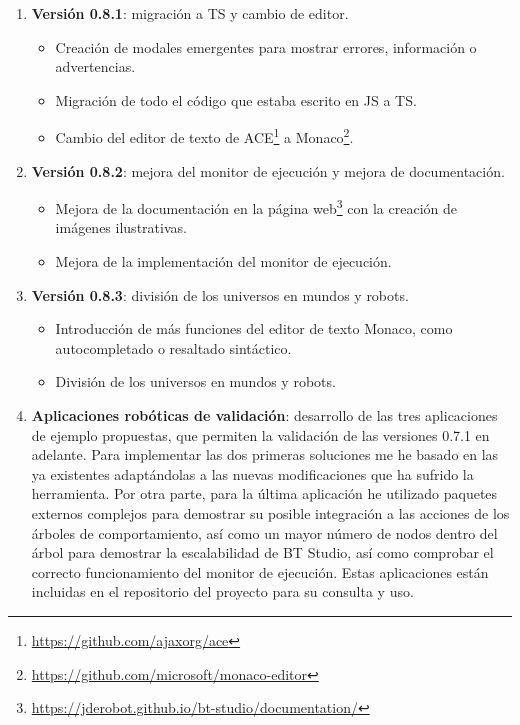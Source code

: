 \begin{enumerate}
    \item \textbf{Versión 0.8.1}: migración a TS y cambio de editor.
    \begin{itemize}
        \item Creación de modales emergentes para mostrar errores, información o advertencias.
        \item Migración de todo el código que estaba escrito en JS a TS.
        \item Cambio del editor de texto de ACE\footnote{\url{https://github.com/ajaxorg/ace}} a Monaco\footnote{\url{https://github.com/microsoft/monaco-editor}}.
    \end{itemize}

    \item \textbf{Versión 0.8.2}: mejora del monitor de ejecución y mejora de documentación.
    \begin{itemize}
        \item Mejora de la documentación en la página web\footnote{\url{https://jderobot.github.io/bt-studio/documentation/}} con la creación de imágenes ilustrativas.
        \item Mejora de la implementación del monitor de ejecución.
    \end{itemize}

    \item \textbf{Versión 0.8.3}: división de los universos en mundos y robots.
    \begin{itemize}
        \item Introducción de más funciones del editor de texto Monaco, como autocompletado o resaltado sintáctico.
        \item División de los universos en mundos y robots.
    \end{itemize}

    \item \textbf{Aplicaciones robóticas de validación}: desarrollo de las tres aplicaciones de ejemplo propuestas, que permiten la validación de las versiones 0.7.1 en adelante. Para implementar las dos primeras soluciones me he basado en las ya existentes adaptándolas a las nuevas modificaciones que ha sufrido la herramienta. Por otra parte, para la última aplicación he utilizado paquetes externos complejos para demostrar su posible integración a las acciones de los árboles de comportamiento, así como un mayor número de nodos dentro del árbol para demostrar la escalabilidad de BT Studio, así como comprobar el correcto funcionamiento del monitor de ejecución. Estas aplicaciones están incluidas en el repositorio del proyecto para su consulta y uso. 
    
\end{enumerate}